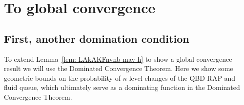 \section{To global convergence}\label{sec: local to global}
\subsection{First, another domination condition}
To extend Lemma~\ref{lem: LAkAKFnvnb mav h} to show a global convergence result we will use the Dominated Convergence Theorem. Here we show some geometric bounds on the probability of \(n\) level changes of the QBD-RAP and fluid queue, which ultimately serve as a dominating function in the Dominated Convergence Theorem. 


